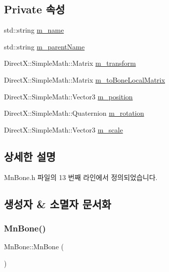 \subsection*{Private 속성}
\begin{DoxyCompactItemize}
\item 
std\+::string \hyperlink{class_m_n_l_1_1_mn_bone_adca6ae47b891bd0c63393a27f6c6eacb}{m\+\_\+name}
\item 
std\+::string \hyperlink{class_m_n_l_1_1_mn_bone_a73c16374ec9bd66ccb36d8a7f7a022ce}{m\+\_\+parent\+Name}
\item 
Direct\+X\+::\+Simple\+Math\+::\+Matrix \hyperlink{class_m_n_l_1_1_mn_bone_aea47d357de786e87817f49963ae22bea}{m\+\_\+transform}
\item 
Direct\+X\+::\+Simple\+Math\+::\+Matrix \hyperlink{class_m_n_l_1_1_mn_bone_a99bbff737e6e67c9be126bcf6be0c3b5}{m\+\_\+to\+Bone\+Local\+Matrix}
\item 
Direct\+X\+::\+Simple\+Math\+::\+Vector3 \hyperlink{class_m_n_l_1_1_mn_bone_a038566003fe128d05d36167353772701}{m\+\_\+position}
\item 
Direct\+X\+::\+Simple\+Math\+::\+Quaternion \hyperlink{class_m_n_l_1_1_mn_bone_ae891a94f5086aea0e3f136d54749dade}{m\+\_\+rotation}
\item 
Direct\+X\+::\+Simple\+Math\+::\+Vector3 \hyperlink{class_m_n_l_1_1_mn_bone_a7919dddae372b5511dc2adab951c6dc5}{m\+\_\+scale}
\end{DoxyCompactItemize}


\subsection{상세한 설명}


Mn\+Bone.\+h 파일의 13 번째 라인에서 정의되었습니다.



\subsection{생성자 \& 소멸자 문서화}
\mbox{\label{class_m_n_l_1_1_mn_bone_a2f2a084d73c21440e718c3a67a94355b}} 
\subsubsection{\texorpdfstring{Mn\+Bone()}{MnBone()}}
{\footnotesize\ttfamily Mn\+Bone\+::\+Mn\+Bone (\begin{DoxyParamCaption}{ }\end{DoxyParamCaption})}



